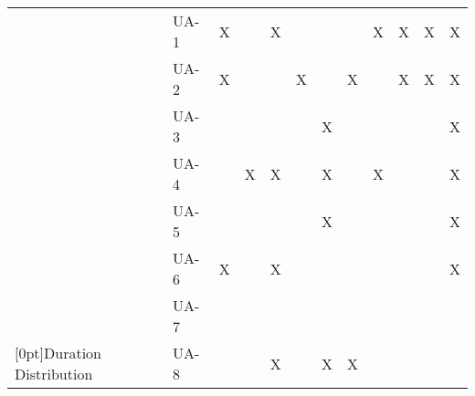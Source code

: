\begin{table}[!htbp]
\begin{tabular}{|l|l|l|l|l|l|l|l|l|l|l|l|}
    &  UA-1 &  X  &     &  X  &     &     &     &  X  &  X  &  X  &  X  \\ \cline{2-12} 
    &  UA-2 &  X  &     &     &  X  &     &  X  &     &  X  &  X  &  X  \\ \cline{2-12} 
    &  UA-3 &     &     &     &     &  X  &     &     &     &     &  X  \\ \cline{2-12}  
    &  UA-4 &     &  X  &  X  &     &  X  &     &  X  &     &     &  X  \\ \cline{2-12} 
    &  UA-5 &     &     &     &     &  X  &     &     &     &     &  X  \\ \cline{2-12}  
    &  UA-6 &  X  &     &  X  &     &     &     &     &     &     &  X  \\ \cline{2-12} 
    &  UA-7 &     &     &     &     &     &     &     &     &     &     \\ \cline{2-12}  
\raisebox{10ex}[0pt]{Duration  Distribution}  
    &  UA-8 &     &     &  X  &     &  X  &  X  &     &     &     &     \\ \hline
    \end{tabular}
\end{table}

